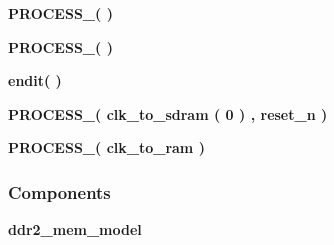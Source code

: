 \begin{DoxyCompactItemize}
\item 
{\bf P\+R\+O\+C\+E\+S\+S\+\_}{\bfseries  (  )}
\item 
{\bf P\+R\+O\+C\+E\+S\+S\+\_}{\bfseries  (  )}
\item 
{\bf endit}{\bfseries  (  )}
\item 
{\bf P\+R\+O\+C\+E\+S\+S\+\_}{\bfseries  ( {\bfseries {\bfseries {\bf clk\+\_\+to\+\_\+sdram}} \textcolor{vhdlchar}{(}\textcolor{vhdlchar}{ } \textcolor{vhdldigit}{0} \textcolor{vhdlchar}{)}\textcolor{vhdlchar}{ }} , {\bfseries {\bfseries {\bf reset\+\_\+n}} \textcolor{vhdlchar}{ }} )}
\item 
{\bf P\+R\+O\+C\+E\+S\+S\+\_}{\bfseries  ( {\bfseries {\bfseries {\bf clk\+\_\+to\+\_\+ram}} \textcolor{vhdlchar}{ }} )}
\end{DoxyCompactItemize}
\subsubsection*{Components}
 \begin{DoxyCompactItemize}
\item 
{\bf ddr2\+\_\+mem\+\_\+model}  {\bfseries }  
\end{DoxyCompactItemize}
